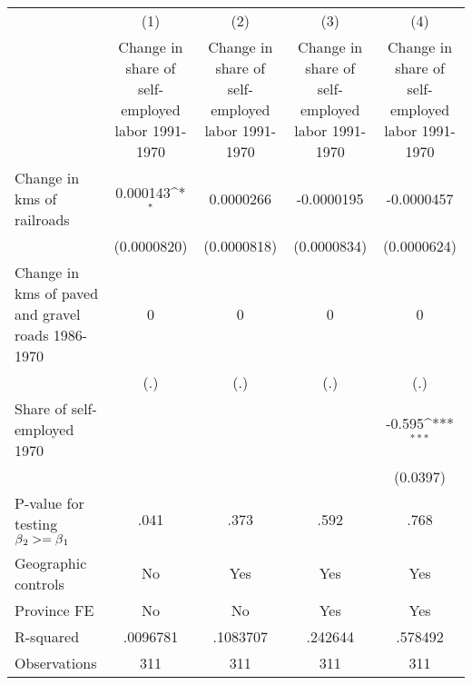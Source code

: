 {
\def\sym#1{\ifmmode^{#1}\else\(^{#1}\)\fi}
\begin{tabular}{l*{4}{c}}
\hline\hline
                &\multicolumn{1}{c}{(1)}&\multicolumn{1}{c}{(2)}&\multicolumn{1}{c}{(3)}&\multicolumn{1}{c}{(4)}\\
                &\multicolumn{1}{c}{Change in share of self-employed labor 1991-1970}&\multicolumn{1}{c}{Change in share of self-employed labor 1991-1970}&\multicolumn{1}{c}{Change in share of self-employed labor 1991-1970}&\multicolumn{1}{c}{Change in share of self-employed labor 1991-1970}\\
\hline
Change in kms of railroads& 0.000143\sym{*}  &0.0000266         &-0.0000195         &-0.0000457         \\
                &(0.0000820)         &(0.0000818)         &(0.0000834)         &(0.0000624)         \\
[1em]
Change in kms of paved and gravel roads 1986-1970&        0         &        0         &        0         &        0         \\
                &      (.)         &      (.)         &      (.)         &      (.)         \\
[1em]
Share of self-employed 1970&                  &                  &                  &   -0.595\sym{***}\\
                &                  &                  &                  & (0.0397)         \\
\hline
P-value for testing $\beta\\_2 >= \beta\\_1$&     .041         &     .373         &     .592         &     .768         \\
Geographic controls&       No         &      Yes         &      Yes         &      Yes         \\
Province FE     &       No         &       No         &      Yes         &      Yes         \\
R-squared       & .0096781         & .1083707         &  .242644         &  .578492         \\
Observations    &      311         &      311         &      311         &      311         \\
\hline\hline
\end{tabular}
}
